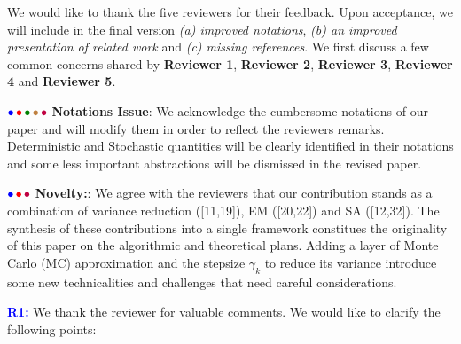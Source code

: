 \documentclass{article}
\begin{document}
We would like to thank the five reviewers for their feedback. Upon acceptance, we will include in the final version \emph{{\sf (a)} improved notations}, \emph{{\sf (b)} an improved presentation of related work} and \emph{{\sf (c)} missing references}. 
We first discuss a few common concerns shared by \textbf{\color{blue}Reviewer 1}, \textbf{\color{red} Reviewer 2}, \textbf{\color{green!50!black}Reviewer 3}, \textbf{\color{brown}Reviewer 4} and \textbf{\color{purple}Reviewer 5}.

${\color{blue}\bullet}\!~{\color{red}\bullet}\!~{\color{green!50!black}\bullet}\!~{\color{brown}\bullet}\!~{\color{purple}\bullet}$ \textbf{Notations Issue}: 
We acknowledge the cumbersome notations of our paper and will modify them in order to reflect the reviewers remarks. 
Deterministic and Stochastic quantities will be clearly identified in their notations and some less important abstractions will be dismissed in the revised paper.\vspace{-5pt}


${\color{blue}\bullet}\!~{\color{red}\bullet}\!~{\color{purple}\bullet}$ \textbf{Novelty:}: 
We agree with the reviewers that our contribution stands as a combination of variance reduction ([11,19]), EM ([20,22]) and SA ([12,32]). 
The synthesis of these contributions into a single framework constitues the originality of this paper on the algorithmic and theoretical plans.
Adding a layer of Monte Carlo (MC) approximation and the stepsize $\gamma_k$ to reduce its variance introduce some new technicalities and challenges that need careful considerations.


\textbf{\textcolor{blue}{R1:}} We thank the reviewer for valuable comments. We would like to clarify the following points:\vspace{-5pt}

\end{document}
